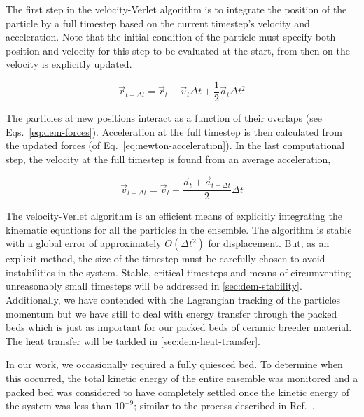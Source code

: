 The first step in the velocity-Verlet algorithm is to integrate the position of the particle by a full timestep based on the current timestep's velocity and acceleration. Note that the initial condition of the particle must specify both position and velocity for this step to be evaluated at the start, from then on the velocity is explicitly updated.

\begin{equation}
	\vec{r}_{t+\Delta t} = \vec{r}_t + \vec{v}_t\Delta t + \frac{1}{2}\vec{a}_t\Delta t^2
\end{equation}

The particles at new positions interact as a function of their overlaps (see Eqs.~\ref{eq:dem-forces}). Acceleration at the full timestep is then calculated from the updated forces (of Eq.~\ref{eq:newton-acceleration}). In the last computational step, the velocity at the full timestep is found from an average acceleration,

\begin{equation}
	\vec{v}_{t+\Delta t} = \vec{v}_t + \frac{\vec{a}_t + \vec{a}_{t+\Delta t}}{2}\Delta t
\end{equation}

The velocity-Verlet algorithm is an efficient means of explicitly integrating the kinematic equations for all the particles in the ensemble. The algorithm is stable with a global error of approximately $O(\Delta t^2)$ for displacement.\cite{Grubmuller1991} But, as an explicit method, the size of the timestep must be carefully chosen to avoid instabilities in the system. Stable, critical timesteps and means of circumventing unreasonably small timesteps will be addressed in \cref{sec:dem-stability}. Additionally, we have contended with the Lagrangian tracking of the particles momentum but we have still to deal with energy transfer through the packed beds which is just as important for our packed beds of ceramic breeder material. The heat transfer will be tackled in \cref{sec:dem-heat-transfer}.

In our work, we occasionally required a fully quiesced bed. To determine when this occurred, the total kinetic energy of the entire ensemble was monitored and a packed bed was considered to have completely settled once the kinetic energy of the system was less than $10^{-9}$; similar to the process described in Ref.~\cite{Silbert2002}. 